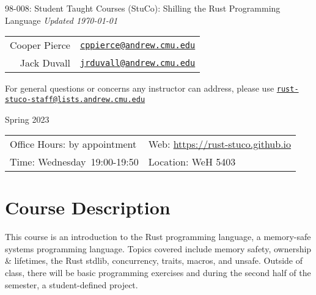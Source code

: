 \documentclass{article}
\newcommand{\longcoursename}{
    Student Taught Courses (StuCo): Shilling the Rust Programming Language
}
\newcommand{\courselocation}{WeH 5403}
\newcommand{\meetingstarttime}{19:00}
\newcommand{\meetingendtime}{19:50}
\newcommand{\meetingdays}{Wednesday}
\newcommand{\longsemester}{Spring 2023}
\newcommand{\deptcode}{98}
\newcommand{\coursecode}{008}
\newcommand{\fullcoursecode}{\deptcode-\coursecode}
\begin{document}
\thispagestyle{empty}
\begin{center}
\begin{minipage}{.85\textwidth}
    \centering
    {\huge {\fullcoursecode: \longcoursename}}
    {\small \textit{Updated \today}}

    \vspace{1em}

    \begin{tabular}{@{}rl@{}}
        Cooper Pierce & \href{mailto:cppierce@andrew.cmu.edu}{\texttt{cppierce@andrew.cmu.edu}} \\ 
        Jack Duvall & \href{mailto:jrduvall@andrew.cmu.edu}{\texttt{jrduvall@andrew.cmu.edu}} \\
    \end{tabular}

    \vspace{1em}

    \begin{center}
        For general questions or concerns any instructor can address, please use 
        \href{mailto:rust-stuco-staff@lists.andrew.cmu.edu}{\texttt{rust-stuco-staff@lists.andrew.cmu.edu}}
    \end{center}

    \vspace{1em}

    \longsemester
\end{minipage}
\end{center}

\vspace{3em}


\begin{tabular*}{.93\textwidth}{@{\extracolsep{\fill}}ll}
    \toprule
    Office Hours: by appointment & Web: \url{https://rust-stuco.github.io} \\
    Time: \meetingdays\ \meetingstarttime-\meetingendtime & Location: \courselocation \\
    \bottomrule
\end{tabular*}

\vspace{5em}

\section*{Course Description}

This course is an introduction to the Rust programming language, a memory-safe
systems programming language. Topics covered include memory safety, ownership \&
lifetimes, the Rust stdlib, concurrency, traits, macros, and unsafe. Outside of
class, there will be basic programming exercises and during the second half of
the semester, a student-defined project.
\end{document}
